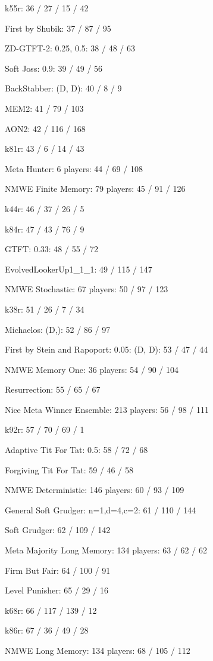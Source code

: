 \item k55r: 36 / 27 / 15 / 42
\item First by Shubik: 37 / 87 / 95
\item ZD-GTFT-2: 0.25, 0.5: 38 / 48 / 63
\item Soft Joss: 0.9: 39 / 49 / 56
\item BackStabber: (D, D): 40 / 8 / 9
\item MEM2: 41 / 79 / 103
\item AON2: 42 / 116 / 168
\item k81r: 43 / 6 / 14 / 43
\item Meta Hunter: 6 players: 44 / 69 / 108
\item NMWE Finite Memory: 79 players: 45 / 91 / 126
\item k44r: 46 / 37 / 26 / 5
\item k84r: 47 / 43 / 76 / 9
\item GTFT: 0.33: 48 / 55 / 72
\item EvolvedLookerUp1\_1\_1: 49 / 115 / 147
\item NMWE Stochastic: 67 players: 50 / 97 / 123
\item k38r: 51 / 26 / 7 / 34
\item Michaelos: (D,): 52 / 86 / 97
\item First by Stein and Rapoport: 0.05: (D, D): 53 / 47 / 44
\item NMWE Memory One: 36 players: 54 / 90 / 104
\item Resurrection: 55 / 65 / 67
\item Nice Meta Winner Ensemble: 213 players: 56 / 98 / 111
\item k92r: 57 / 70 / 69 / 1
\item Adaptive Tit For Tat: 0.5: 58 / 72 / 68
\item Forgiving Tit For Tat: 59 / 46 / 58
\item NMWE Deterministic: 146 players: 60 / 93 / 109
\item General Soft Grudger: n=1,d=4,c=2: 61 / 110 / 144
\item Soft Grudger: 62 / 109 / 142
\item Meta Majority Long Memory: 134 players: 63 / 62 / 62
\item Firm But Fair: 64 / 100 / 91
\item Level Punisher: 65 / 29 / 16
\item k68r: 66 / 117 / 139 / 12
\item k86r: 67 / 36 / 49 / 28
\item NMWE Long Memory: 134 players: 68 / 105 / 112
